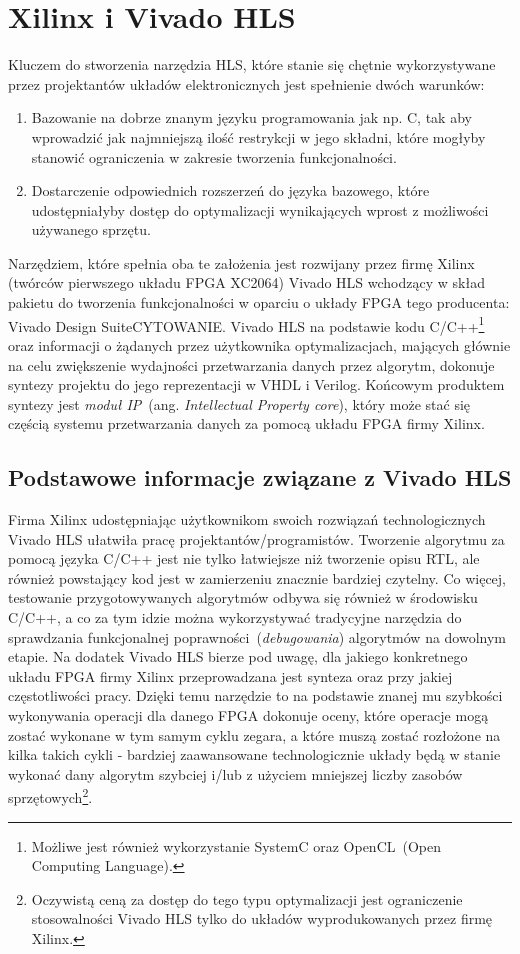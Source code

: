 \section{Xilinx i Vivado HLS}
Kluczem do stworzenia narzędzia HLS, które stanie się chętnie wykorzystywane przez projektantów układów elektronicznych jest spełnienie dwóch warunków:
\begin{enumerate}
\item Bazowanie na dobrze znanym języku programowania jak np. C, tak aby wprowadzić jak najmniejszą ilość restrykcji w jego składni, które mogłyby stanowić ograniczenia w zakresie tworzenia funkcjonalności.
\item Dostarczenie odpowiednich rozszerzeń do języka bazowego, które udostępniałyby dostęp do optymalizacji wynikających wprost z możliwości używanego sprzętu.
\end{enumerate}
Narzędziem, które spełnia oba te założenia jest rozwijany przez firmę Xilinx (twórców pierwszego układu FPGA XC2064) Vivado HLS wchodzący w skład pakietu do tworzenia funkcjonalności w oparciu o układy FPGA tego producenta: Vivado Design Suite{\color{red}CYTOWANIE}. Vivado HLS na podstawie kodu C/C++\footnote{Możliwe jest również wykorzystanie SystemC oraz OpenCL~(Open Computing Language).} oraz informacji o żądanych przez użytkownika optymalizacjach, mających głównie na celu zwiększenie wydajności przetwarzania danych przez algorytm, dokonuje syntezy projektu do jego reprezentacji w VHDL i Verilog. Końcowym produktem syntezy jest \textit{moduł IP}~(ang. \textit{Intellectual Property core}), który może stać się częścią systemu przetwarzania danych za pomocą układu FPGA firmy Xilinx.

\subsection{Podstawowe informacje związane z Vivado HLS}
Firma Xilinx udostępniając użytkownikom swoich rozwiązań technologicznych Vivado HLS ułatwiła pracę projektantów/programistów. Tworzenie algorytmu za pomocą języka C/C++ jest nie tylko łatwiejsze niż tworzenie opisu RTL, ale również powstający kod jest w zamierzeniu znacznie bardziej czytelny. Co więcej, testowanie przygotowywanych algorytmów odbywa się również w środowisku C/C++, a co za tym idzie można wykorzystywać tradycyjne narzędzia do sprawdzania funkcjonalnej poprawności~(\textit{debugowania}) algorytmów na dowolnym etapie. Na dodatek Vivado HLS bierze pod uwagę, dla jakiego konkretnego układu FPGA firmy Xilinx przeprowadzana jest synteza oraz przy jakiej częstotliwości pracy. Dzięki temu narzędzie to na podstawie znanej mu szybkości wykonywania operacji dla danego FPGA dokonuje oceny, które operacje mogą zostać wykonane w tym samym cyklu zegara, a które muszą zostać rozłożone na kilka takich cykli - bardziej zaawansowane technologicznie układy będą w stanie wykonać dany algorytm szybciej i/lub z użyciem mniejszej liczby zasobów sprzętowych\footnote{Oczywistą ceną za dostęp do tego typu optymalizacji jest ograniczenie stosowalności Vivado HLS tylko do układów wyprodukowanych przez firmę Xilinx.}.

